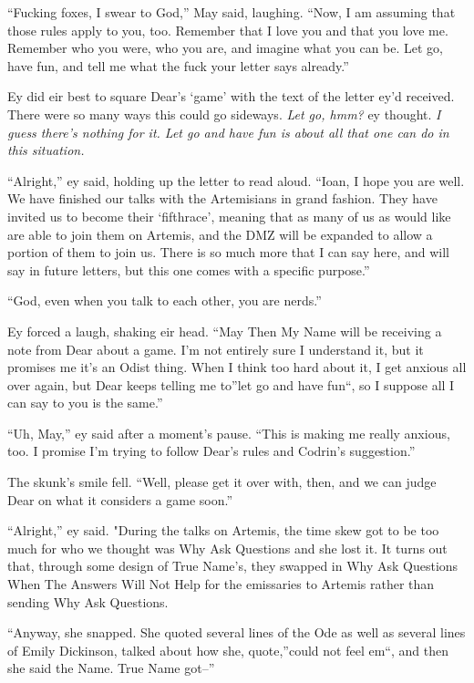 ``Fucking foxes, I swear to God,'' May said, laughing. ``Now, I am assuming that those rules apply to you, too. Remember that I love you and that you love me. Remember who you were, who you are, and imagine what you can be. Let go, have fun, and tell me what the fuck your letter says already.''

Ey did eir best to square Dear's `game' with the text of the letter ey'd received. There were so many ways this could go sideways. \emph{Let go, hmm?} ey thought. \emph{I guess there's nothing for it. Let go and have fun is about all that one can do in this situation.}

``Alright,'' ey said, holding up the letter to read aloud. ``Ioan, I hope you are well. We have finished our talks with the Artemisians in grand fashion. They have invited us to become their `fifthrace', meaning that as many of us as would like are able to join them on Artemis, and the DMZ will be expanded to allow a portion of them to join us. There is so much more that I can say here, and will say in future letters, but this one comes with a specific purpose.''

``God, even when you talk to each other, you are nerds.''

Ey forced a laugh, shaking eir head. ``May Then My Name will be receiving a note from Dear about a game. I'm not entirely sure I understand it, but it promises me it's an Odist thing. When I think too hard about it, I get anxious all over again, but Dear keeps telling me to''let go and have fun``, so I suppose all I can say to you is the same.''

``Uh, May,'' ey said after a moment's pause. ``This is making me really anxious, too. I promise I'm trying to follow Dear's rules and Codrin's suggestion.''

The skunk's smile fell. ``Well, please get it over with, then, and we can judge Dear on what it considers a game soon.''

``Alright,'' ey said. "During the talks on Artemis, the time skew got to be too much for who we thought was Why Ask Questions and she lost it. It turns out that, through some design of True Name's, they swapped in Why Ask Questions When The Answers Will Not Help for the emissaries to Artemis rather than sending Why Ask Questions.

``Anyway, she snapped. She quoted several lines of the Ode as well as several lines of Emily Dickinson, talked about how she, quote,''could not feel em``, and then she said the Name. True Name got--''

